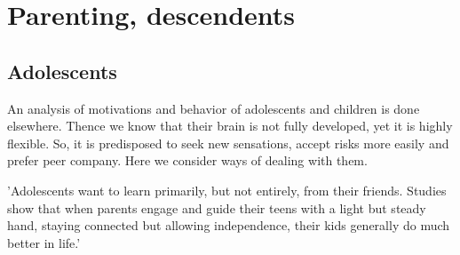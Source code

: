 \documentclass[oneside, article]{memoir}
\begin{document}
% 



\chapter{Parenting, descendents}
\section{Adolescents}
An analysis of motivations and behavior of adolescents and children is done elsewhere. Thence we know that their brain is not fully developed, yet it is highly flexible. So, it is predisposed to seek new sensations, accept risks more easily and prefer peer company. Here we consider ways of dealing with them.

'Adolescents want to learn primarily, but not entirely, from their friends. Studies show that when parents engage and guide their teens with a light but steady hand, staying connected but allowing independence, their kids generally do much better in life.'
\end{document}
